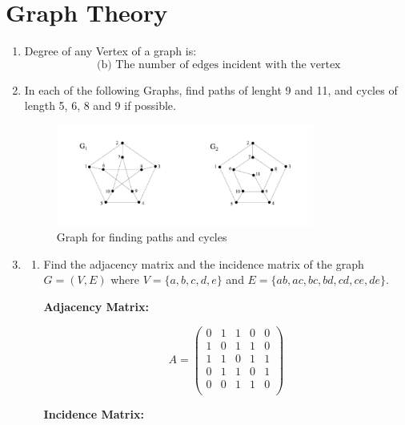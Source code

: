 \documentclass[a3paper,12pt]{extarticle} %
\begin{document}
\section{Graph Theory}
\begin{enumerate}
    \item Degree of any Vertex of a graph is:
    \[
        \text{ (b) The number of edges incident with the vertex}
    \]
    \item In each of the following Graphs, find paths of lenght 9 and 11, and cycles of length 5, 6, 8 and 9 if possible.
    \begin{figure}[h!]
        \centering
        \includegraphics[width=0.8\textwidth]{PGM-graph.png}
        \caption{Graph for finding paths and cycles}
        \label{fig:pgm-graph}
    \end{figure}
    \item \begin{enumerate}
        \item 
    Find the adjacency matrix and the incidence matrix of the graph \( G = (V, E) \) where
    \( V = \{a, b, c, d, e\} \) and \( E = \{ab, ac, bc, bd, cd, ce, de\} \).

    \textbf{Adjacency Matrix:}

    \[
    A = \begin{pmatrix}
    0 & 1 & 1 & 0 & 0 \\
    1 & 0 & 1 & 1 & 0 \\
    1 & 1 & 0 & 1 & 1 \\
    0 & 1 & 1 & 0 & 1 \\
    0 & 0 & 1 & 1 & 0 \\
    \end{pmatrix}
    \]

    \textbf{Incidence Matrix:}


\end{enumerate}
\end{enumerate}
\end{document}
